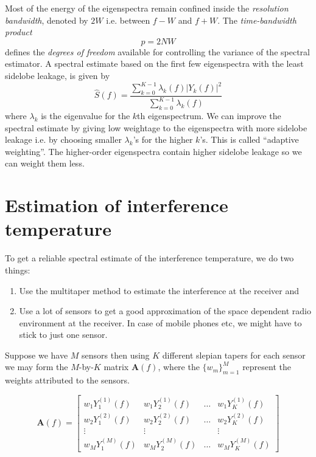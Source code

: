 \documentclass[12pt]{article}
\begin{document}
Most of the energy of the eigenspectra remain confined inside the \emph{resolution bandwidth}, denoted by $2W$ i.e. between $f-W$ and $f+W$. The \emph{time-bandwidth product}
\begin{equation}
    p = 2NW
\end{equation}
defines the \emph{degrees of freedom} available for controlling the variance of the spectral estimator.
A spectral estimate based on the first few eigenspectra with the least sidelobe leakage, is given by
\begin{equation}
    \hat{S}(f) = \frac{\sum_{k=0}^{K-1} \lambda_k(f) |Y_k(f)|^2}{\sum_{k=0}^{K-1} \lambda_k(f)}
\end{equation}
where $\lambda_k$ is the eigenvalue for the $k$th eigenspectrum. We can improve the spectral estimate by giving low weightage to the eigenspectra with more sidelobe leakage i.e. by choosing smaller $\lambda_k$'s for the higher $k$'s. This is called ``adaptive weighting''. The higher-order eigenspectra contain higher sidelobe leakage so we can weight them less.

\section{Estimation of interference temperature}
To get a reliable spectral estimate of the interference temperature, we do two things:
\begin{enumerate}
    \item Use the multitaper method to estimate the interference at the receiver and
    \item Use a lot of sensors to get a good approximation of the space dependent radio environment at the receiver. In case of mobile phones etc, we might have to stick to just one sensor.
\end{enumerate}


Suppose we have $M$ sensors then using $K$ different slepian tapers for each sensor we may form the $M$-by-$K$ matrix $\mathbf{A}(f)$, where the $\{w_m\}_{m=1}^M$ represent the weights attributed to the sensors.

\begin{equation}
    \mathbf{A}(f) = 
    \begin{bmatrix}
        w_1Y_1^{(1)}(f) & w_1Y_2^{(1)}(f) & \ldots & w_1Y_K^{(1)}(f) \\
        w_2Y_1^{(2)}(f) & w_2Y_2^{(2)}(f) & \ldots & w_2Y_K^{(2)}(f) \\
        \vdots & \vdots && \vdots \\
        w_MY_1^{(M)}(f) & w_MY_2^{(M)}(f) & \ldots & w_MY_K^{(M)}(f)
    \end{bmatrix}
\end{equation}
\end{document}
